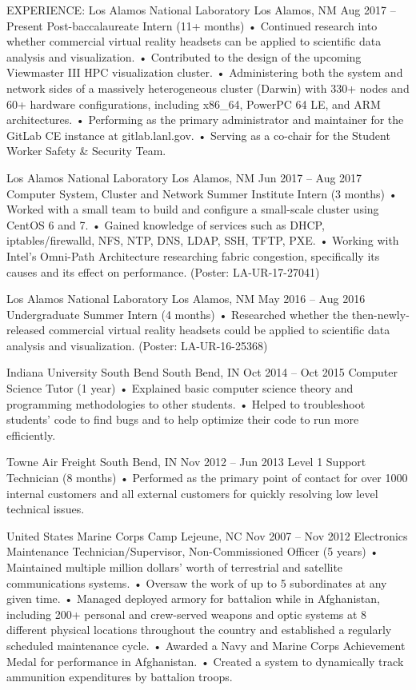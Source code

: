 
EXPERIENCE:
Los Alamos National Laboratory	Los Alamos, NM	Aug 2017 – Present
Post-baccalaureate Intern		(11+ months)
•	Continued research into whether commercial virtual reality headsets can be applied to scientific data analysis and visualization.
•	Contributed to the design of the upcoming Viewmaster III HPC visualization cluster.
•	Administering both the system and network sides of a massively heterogeneous cluster (Darwin) with 330+ nodes and 60+ hardware configurations, including x86_64, PowerPC 64 LE, and ARM architectures.
•	Performing as the primary administrator and maintainer for the GitLab CE instance at gitlab.lanl.gov.
•	Serving as a co-chair for the Student Worker Safety & Security Team.

Los Alamos National Laboratory	Los Alamos, NM	Jun 2017 – Aug 2017
Computer System, Cluster and Network Summer Institute Intern	(3 months)
•	Worked with a small team to build and configure a small-scale cluster using CentOS 6 and 7.
•	Gained knowledge of services such as DHCP, iptables/firewalld, NFS, NTP, DNS, LDAP, SSH, TFTP, PXE.
•	Working with Intel’s Omni-Path Architecture researching fabric congestion, specifically its causes and its effect on performance. (Poster: LA-UR-17-27041)

Los Alamos National Laboratory	Los Alamos, NM	May 2016 – Aug 2016
Undergraduate Summer Intern		(4 months)
•	Researched whether the then-newly-released commercial virtual reality headsets could be applied to scientific data analysis and visualization. (Poster: LA-UR-16-25368)

Indiana University South Bend	South Bend, IN	Oct 2014 – Oct 2015
Computer Science Tutor		(1 year)
•	Explained basic computer science theory and programming methodologies to other students.
•	Helped to troubleshoot students’ code to find bugs and to help optimize their code to run more efficiently.

Towne Air Freight	South Bend, IN	Nov 2012 – Jun 2013
Level 1 Support Technician		(8 months)
•	Performed as the primary point of contact for over 1000 internal customers and all external customers for quickly resolving low level technical issues.

United States Marine Corps	Camp Lejeune, NC	Nov 2007 – Nov 2012
Electronics Maintenance Technician/Supervisor, Non-Commissioned Officer	(5 years)
•	Maintained multiple million dollars’ worth of terrestrial and satellite communications systems.
•	Oversaw the work of up to 5 subordinates at any given time.
•	Managed deployed armory for battalion while in Afghanistan, including 200+ personal and crew-served weapons and optic systems at 8 different physical locations throughout the country and established a regularly scheduled maintenance cycle.
•	Awarded a Navy and Marine Corps Achievement Medal for performance in Afghanistan.
•	Created a system to dynamically track ammunition expenditures by battalion troops.

